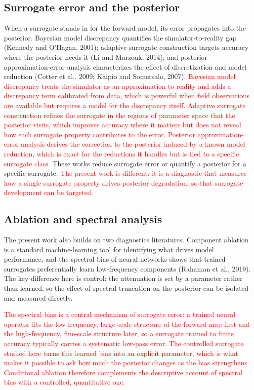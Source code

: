 \documentclass[12pt]{article}
\newcommand{\add}[1]{\textcolor{red}{#1}}
\begin{document}
\subsection{Surrogate error and the posterior}

When a surrogate stands in for the forward model, its error propagates into the posterior. Bayesian model discrepancy quantifies the simulator-to-reality gap (Kennedy and O'Hagan, 2001); adaptive surrogate construction targets accuracy where the posterior needs it (Li and Marzouk, 2014); and posterior approximation-error analysis characterizes the effect of discretization and model reduction (Cotter et al., 2009; Kaipio and Somersalo, 2007). \add{Bayesian model discrepancy treats the simulator as an approximation to reality and adds a discrepancy term calibrated from data, which is powerful when field observations are available but requires a model for the discrepancy itself. Adaptive surrogate construction refines the surrogate in the regions of parameter space that the posterior visits, which improves accuracy where it matters but does not reveal how each surrogate property contributes to the error. Posterior approximation-error analysis derives the correction to the posterior induced by a known model reduction, which is exact for the reductions it handles but is tied to a specific surrogate class.} These works reduce surrogate error or quantify a posterior for a specific surrogate. \add{The present work is different: it is a diagnostic that measures how a single surrogate property drives posterior degradation, so that surrogate development can be targeted.}

\subsection{Ablation and spectral analysis}

The present work also builds on two diagnostics literatures. Component ablation is a standard machine-learning tool for identifying what drives model performance, and the spectral bias of neural networks shows that trained surrogates preferentially learn low-frequency components (Rahaman et al., 2019). The key difference here is control: the attenuation is set by a parameter rather than learned, so the effect of spectral truncation on the posterior can be isolated and measured directly.

\add{The spectral bias is a central mechanism of surrogate error: a trained neural operator fits the low-frequency, large-scale structure of the forward map first and the high-frequency, fine-scale structure later, so a surrogate trained to finite accuracy typically carries a systematic low-pass error. The controlled surrogate studied here turns this learned bias into an explicit parameter, which is what makes it possible to ask how much the posterior changes as the bias strengthens. Conditional ablation therefore complements the descriptive account of spectral bias with a controlled, quantitative one.}
\end{document}
